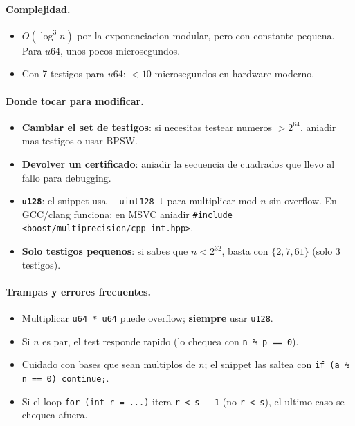 \paragraph{Complejidad.}
\begin{itemize}\setlength\itemsep{0pt}
	\item $O(\log^3 n)$ por la exponenciacion modular, pero con constante pequena. Para $u64$, unos pocos microsegundos.
	\item Con 7 testigos para $u64$: $< 10$ microsegundos en hardware moderno.
\end{itemize}

\paragraph{Donde tocar para modificar.}
\begin{itemize}\setlength\itemsep{0pt}
	\item \textbf{Cambiar el set de testigos}: si necesitas testear numeros $> 2^{64}$, aniadir mas testigos o usar BPSW.
	\item \textbf{Devolver un certificado}: aniadir la secuencia de cuadrados que llevo al fallo para debugging.
	\item \textbf{\texttt{u128}}: el snippet usa \texttt{\_\_uint128\_t} para multiplicar mod $n$ sin overflow. En GCC/clang funciona; en MSVC aniadir \texttt{\#include <boost/multiprecision/cpp\_int.hpp>}.
	\item \textbf{Solo testigos pequenos}: si sabes que $n < 2^{32}$, basta con $\{2, 7, 61\}$ (solo 3 testigos).
\end{itemize}

\paragraph{Trampas y errores frecuentes.}
\begin{itemize}\setlength\itemsep{0pt}
	\item Multiplicar \texttt{u64 * u64} puede overflow; \textbf{siempre} usar \texttt{u128}.
	\item Si $n$ es par, el test responde rapido (lo chequea con \texttt{n \% p == 0}).
	\item Cuidado con bases que sean multiplos de $n$; el snippet las saltea con \texttt{if (a \% n == 0) continue;}.
	\item Si el loop \texttt{for (int r = ...)} itera \texttt{r < s - 1} (no \texttt{r < s}), el ultimo caso se chequea afuera.
\end{itemize}

